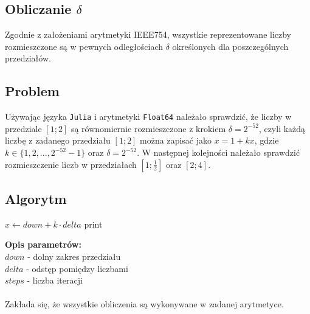 \documentclass{article}
\begin{document}
\subsection{Obliczanie $\delta$}
Zgodnie z założeniami arytmetyki IEEE754, wszystkie reprezentowane liczby rozmieszczone są w pewnych odległościach $\delta$ określonych dla poszczególnych przedziałów.

\subsection{Problem}
Używając języka \texttt{Julia} i arytmetyki \texttt{Float64} należało sprawdzić, że liczby w przedziale $[1;2]$ są równomiernie rozmieszczone z krokiem $\delta = 2^{-52}$, czyli każdą liczbę z zadanego przedziału $[1;2]$ można zapisać jako $x = 1 + kx$, gdzie $k \in \lbrace 1, 2, ..., 2^{-52} - 1 \rbrace$ oraz $\delta = 2^{-52}$.
W następnej kolejności należało sprawdzić rozmieszczenie liczb w przedziałach $[1;\frac{1}{2}]$ oraz $[2;4]$.

\subsection{Algorytm}
\begin{algorithm}
    \begin{algorithmic}[1]
            \State $x \gets down + k \cdot delta$
            \State print 
        \EndFor
        \EndFunction
    \end{algorithmic}
\end{algorithm} 
\textbf{Opis parametrów:} \\
$down$ - dolny zakres przedziału \\
$delta$ - odstęp pomiędzy liczbami \\
$steps$ - liczba iteracji\\\\
Zakłada się, że wszystkie obliczenia są wykonywane w zadanej arytmetyce.
\end{document}
